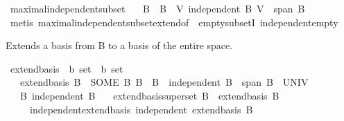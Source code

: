 \begin{isabellebody}
\isanewline
{}\isamarkupfalse%
\ maximal{\isacharunderscore}{\kern0pt}independent{\isacharunderscore}{\kern0pt}subset{\isacharcolon}{\kern0pt}\isanewline
\ \ \ B\ \ {\isachardoublequoteopen}B\ {\isasymsubseteq}\ V{\isachardoublequoteclose}\ {\isachardoublequoteopen}independent\ B{\isachardoublequoteclose}\ {\isachardoublequoteopen}V\ {\isasymsubseteq}\ span\ B{\isachardoublequoteclose}\isanewline
%
\isadelimproof
\ \ %
\endisadelimproof
%
\isatagproof
{}\isamarkupfalse%
\ {\isacharparenleft}{\kern0pt}metis\ maximal{\isacharunderscore}{\kern0pt}independent{\isacharunderscore}{\kern0pt}subset{\isacharunderscore}{\kern0pt}extend{\isacharbrackleft}{\kern0pt}of\ {\isachardoublequoteopen}{\isacharbraceleft}{\kern0pt}{\isacharbraceright}{\kern0pt}{\isachardoublequoteclose}{\isacharbrackright}{\kern0pt}\ empty{\isacharunderscore}{\kern0pt}subsetI\ independent{\isacharunderscore}{\kern0pt}empty{\isacharparenright}{\kern0pt}%
\endisatagproof
{\isafoldproof}%
%
\isadelimproof
%
\endisadelimproof
%
\begin{isamarkuptext}%
Extends a basis from B to a basis of the entire space.%
\end{isamarkuptext}\isamarkuptrue%
\isamarkupfalse%
\ extend{\isacharunderscore}{\kern0pt}basis\ {\isacharcolon}{\kern0pt}{\isacharcolon}{\kern0pt}\ {\isachardoublequoteopen}{\isacharprime}{\kern0pt}b\ set\ {\isasymRightarrow}\ {\isacharprime}{\kern0pt}b\ set{\isachardoublequoteclose}\isanewline
\ \ \ {\isachardoublequoteopen}extend{\isacharunderscore}{\kern0pt}basis\ B\ {\isacharequal}{\kern0pt}\ {\isacharparenleft}{\kern0pt}SOME\ B{\isacharprime}{\kern0pt}{\isachardot}{\kern0pt}\ B\ {\isasymsubseteq}\ B{\isacharprime}{\kern0pt}\ {\isasymand}\ independent\ B{\isacharprime}{\kern0pt}\ {\isasymand}\ span\ B{\isacharprime}{\kern0pt}\ {\isacharequal}{\kern0pt}\ UNIV{\isacharparenright}{\kern0pt}{\isachardoublequoteclose}\isanewline
\isanewline
{}\isamarkupfalse%
\isanewline
\ \ \ B{\isacharcolon}{\kern0pt}\ {\isachardoublequoteopen}independent\ B{\isachardoublequoteclose}\isanewline
\ \ \ extend{\isacharunderscore}{\kern0pt}basis{\isacharunderscore}{\kern0pt}superset{\isacharcolon}{\kern0pt}\ {\isachardoublequoteopen}B\ {\isasymsubseteq}\ extend{\isacharunderscore}{\kern0pt}basis\ B{\isachardoublequoteclose}\isanewline
\ \ \ \ \ independent{\isacharunderscore}{\kern0pt}extend{\isacharunderscore}{\kern0pt}basis{\isacharcolon}{\kern0pt}\ {\isachardoublequoteopen}independent\ {\isacharparenleft}{\kern0pt}extend{\isacharunderscore}{\kern0pt}basis\ B{\isacharparenright}{\kern0pt}{\isachardoublequoteclose}\isanewline

\end{isabellebody}
